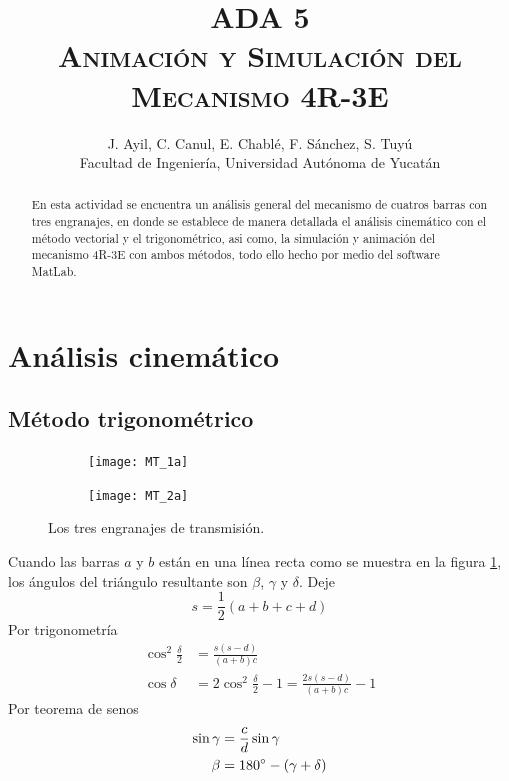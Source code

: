 \documentclass[12pt, final]{extarticle}
\title{ADA 5\\
\textsc{Animación y Simulación del Mecanismo 4R-3E}}
\author{J. Ayil, C. Canul, E. Chablé, F. Sánchez, S. Tuyú\\
{Facultad de Ingeniería, Universidad Autónoma de Yucatán}}
\date{}
\begin{document}
\maketitle

\begin{abstract}
   En esta actividad se encuentra un análisis general del mecanismo de cuatros
   barras con tres engranajes, en donde se establece de manera detallada el
   análisis cinemático con el método vectorial y el trigonométrico, asi como, la
   simulación y animación del mecanismo 4R-3E con ambos métodos, todo ello hecho
   por medio del software MatLab.
\end{abstract}

\section{Análisis cinemático}
\subsection{Método trigonométrico}
\begin{figure}[ht]
    \centering
    \begin{subfigure}[b]{0.45\textwidth}
        \centering
        \texttt{[image: MT\_1a]}
        \caption{}
        \label{Fig: Los tres engranajes de transmision a}
    \end{subfigure}
    \hfill
    \begin{subfigure}[b]{0.45\textwidth}
        \centering
        \texttt{[image: MT\_2a]}
        \caption{}
        \label{Fig: Los tres engranajes de transmision b}
    \end{subfigure}
    \caption{Los tres engranajes de transmisión.}
    \label{Fig: Los tres engranajes de transmision}
\end{figure}

Cuando las barras $a$ y $b$ están en una línea recta como se muestra en la
figura \ref{Fig: Los tres engranajes de transmision a}, los ángulos del
triángulo resultante son $\beta$, $\gamma$ y $\delta$. Deje
\begin{equation}
    s = \frac{1}{2}(a + b + c + d)
\end{equation}
Por trigonometría
\begin{align}
    \cos^2 \frac{\delta}{2} &= \frac{s(s - d)}{(a + b)c} \\
    \cos \delta &= 2\cos^2 \frac{\delta}{2} - 1 = \frac{2s(s - d)}{(a + b)c} - 1
\end{align}
Por teorema de senos
\begin{align}
    \sin \gamma &= \frac{c}{d}\sin\gamma \\
    \beta &= 180\degree - (\gamma + \delta)
\end{align}
\end{document}
